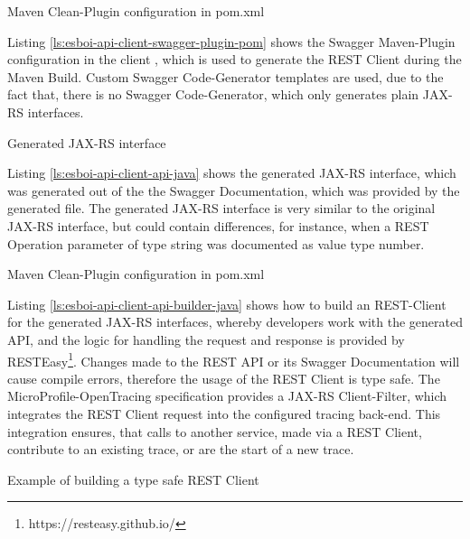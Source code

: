 \begin{listing}[h]
	\caption{Maven Clean-Plugin configuration in pom.xml}
	\label{ls:esboi-api-client-clean-pom}
\end{listing}

Listing \vref{ls:esboi-api-client-swagger-plugin-pom} shows the Swagger Maven-Plugin configuration in the client , which is used to generate the REST Client during the Maven Build. Custom Swagger Code-Generator templates are used, due to the fact that, there is no Swagger Code-Generator, which only generates plain JAX-RS interfaces. 
\newpage

\begin{listing}[h]
	\caption{Generated JAX-RS interface}
	\label{ls:esboi-api-client-swagger-plugin-pom}
\end{listing}

Listing \vref{ls:esboi-api-client-api-java} shows the generated JAX-RS interface, which was generated out of the the Swagger Documentation, which was provided by the generated  file. The generated JAX-RS interface is very similar to the original JAX-RS interface, but could contain differences, for instance, when a REST Operation parameter of type string was documented as value type number.

\begin{listing}[h]
	\caption{Maven Clean-Plugin configuration in pom.xml}
	\label{ls:esboi-api-client-api-java}
\end{listing}

Listing \vref{ls:esboi-api-client-api-builder-java} shows how to build an REST-Client for the generated JAX-RS interfaces, whereby developers work with the generated API, and the logic for handling the request and response is provided by RESTEasy\footnote{https://resteasy.github.io/}. Changes made to the REST API or its Swagger Documentation will cause compile errors, therefore the usage of the REST Client is type safe. The MicroProfile-OpenTracing specification provides a JAX-RS Client-Filter, which integrates the REST Client request into the configured tracing back-end. This integration ensures, that calls to another service, made via a REST Client, contribute to an existing trace, or are the start of a new trace.

\begin{listing}[h]
	\caption{Example of building a type safe REST Client}
	\label{ls:esboi-api-client-api-builder-java}
\end{listing}

